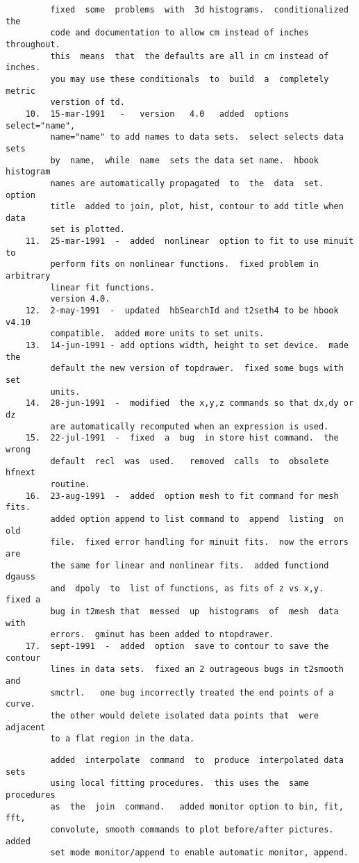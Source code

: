 \begin{verbatim}
         fixed  some  problems  with  3d histograms.  conditionalized the
         code and documentation to allow cm instead of inches throughout.
         this  means  that  the defaults are all in cm instead of inches.
         you may use these conditionals  to  build  a  completely  metric
         verstion of td.  
    10.  15-mar-1991   -   version   4.0   added  options  select="name",
         name="name" to add names to data sets.  select selects data sets
         by  name,  while  name  sets the data set name.  hbook histogram
         names are automatically propagated  to  the  data  set.   option
         title  added to join, plot, hist, contour to add title when data
         set is plotted.  
    11.  25-mar-1991  -  added  nonlinear  option to fit to use minuit to
         perform fits on nonlinear functions.  fixed problem in arbitrary
         linear fit functions.  
         version 4.0.  
    12.  2-may-1991  -  updated  hbSearchId and t2seth4 to be hbook v4.10
         compatible.  added more units to set units.  
    13.  14-jun-1991 - add options width, height to set device.  made the
         default the new version of topdrawer.  fixed some bugs with  set
         units.  
    14.  28-jun-1991  -  modified  the x,y,z commands so that dx,dy or dz
         are automatically recomputed when an expression is used.  
    15.  22-jul-1991  -  fixed  a  bug  in store hist command.  the wrong
         default  recl  was  used.   removed  calls  to  obsolete  hfnext
         routine.  
    16.  23-aug-1991  -  added  option mesh to fit command for mesh fits.
         added option append to list command to  append  listing  on  old
         file.  fixed error handling for minuit fits.  now the errors are
         the same for linear and nonlinear fits.  added functiond  dgauss
         and  dpoly  to  list of functions, as fits of z vs x,y.  fixed a
         bug in t2mesh that  messed  up  histograms  of  mesh  data  with
         errors.  gminut has been added to ntopdrawer.  
    17.  sept-1991  -  added  option  save to contour to save the contour
         lines in data sets.  fixed an 2 outrageous bugs in t2smooth  and
         smctrl.   one bug incorrectly treated the end points of a curve.
         the other would delete isolated data points that  were  adjacent
         to a flat region in the data.  
\end{verbatim}

\begin{verbatim}
         added  interpolate  command  to  produce  interpolated data sets
         using local fitting procedures.  this uses the  same  procedures
         as  the  join  command.   added monitor option to bin, fit, fft,
         convolute, smooth commands to plot before/after pictures.  added
         set mode monitor/append to enable automatic monitor, append.  
\end{verbatim}

